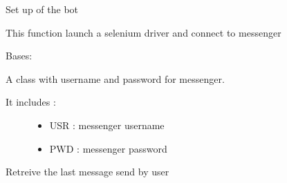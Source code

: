 \documentclass[letterpaper,10pt,english]{sphinxmanual}
\begin{document}
\begin{fulllineitems}
\label{\detokenize{my_tools.monitoring:my_tools.monitoring.message.connect}}
\sphinxAtStartPar
Set up of the bot

\sphinxAtStartPar
This function launch a selenium driver and connect to messenger

\end{fulllineitems}


\begin{fulllineitems}
\label{\detokenize{my_tools.monitoring:my_tools.monitoring.message.monitoring_config}}
\sphinxAtStartPar
Bases: 

\sphinxAtStartPar
A class with username and password for messenger.
\begin{description}
\item[{It includes :}] \leavevmode\begin{itemize}
\item {} 
\sphinxAtStartPar
USR : messenger username

\item {} 
\sphinxAtStartPar
PWD : messenger password

\end{itemize}

\end{description}

\end{fulllineitems}


\begin{fulllineitems}
\label{\detokenize{my_tools.monitoring:my_tools.monitoring.message.retreive_messages}}
\sphinxAtStartPar
Retreive the last message send by user

\end{fulllineitems}
\end{document}
